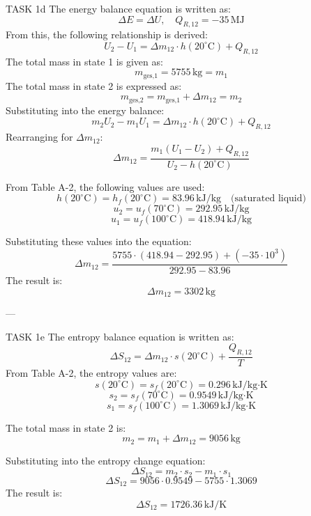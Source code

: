TASK 1d  
The energy balance equation is written as:  
\[
\Delta E = \Delta U, \quad Q_{R,12} = -35 \, \text{MJ}
\]  
From this, the following relationship is derived:  
\[
U_2 - U_1 = \Delta m_{12} \cdot h(20^\circ\text{C}) + Q_{R,12}
\]  
The total mass in state 1 is given as:  
\[
m_{\text{ges,1}} = 5755 \, \text{kg} = m_1
\]  
The total mass in state 2 is expressed as:  
\[
m_{\text{ges,2}} = m_{\text{ges,1}} + \Delta m_{12} = m_2
\]  
Substituting into the energy balance:  
\[
m_2 U_2 - m_1 U_1 = \Delta m_{12} \cdot h(20^\circ\text{C}) + Q_{R,12}
\]  
Rearranging for \( \Delta m_{12} \):  
\[
\Delta m_{12} = \frac{m_1 (U_1 - U_2) + Q_{R,12}}{U_2 - h(20^\circ\text{C})}
\]  

From Table A-2, the following values are used:  
\[
h(20^\circ\text{C}) = h_f(20^\circ\text{C}) = 83.96 \, \text{kJ/kg} \quad \text{(saturated liquid)}
\]  
\[
u_2 = u_f(70^\circ\text{C}) = 292.95 \, \text{kJ/kg}
\]  
\[
u_1 = u_f(100^\circ\text{C}) = 418.94 \, \text{kJ/kg}
\]  

Substituting these values into the equation:  
\[
\Delta m_{12} = \frac{5755 \cdot (418.94 - 292.95) + (-35 \cdot 10^3)}{292.95 - 83.96}
\]  
The result is:  
\[
\Delta m_{12} = 3302 \, \text{kg}
\]  

---

TASK 1e  
The entropy balance equation is written as:  
\[
\Delta S_{12} = \Delta m_{12} \cdot s(20^\circ\text{C}) + \frac{Q_{R,12}}{T}
\]  
From Table A-2, the entropy values are:  
\[
s(20^\circ\text{C}) = s_f(20^\circ\text{C}) = 0.296 \, \text{kJ/kg·K}
\]  
\[
s_2 = s_f(70^\circ\text{C}) = 0.9549 \, \text{kJ/kg·K}
\]  
\[
s_1 = s_f(100^\circ\text{C}) = 1.3069 \, \text{kJ/kg·K}
\]  

The total mass in state 2 is:  
\[
m_2 = m_1 + \Delta m_{12} = 9056 \, \text{kg}
\]  

Substituting into the entropy change equation:  
\[
\Delta S_{12} = m_2 \cdot s_2 - m_1 \cdot s_1
\]  
\[
\Delta S_{12} = 9056 \cdot 0.9549 - 5755 \cdot 1.3069
\]  
The result is:  
\[
\Delta S_{12} = 1726.36 \, \text{kJ/K}
\]  